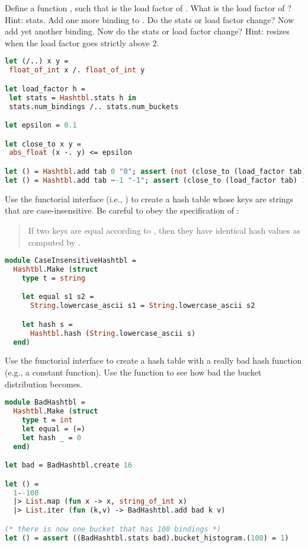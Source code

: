 Define a function , such that  is the load
factor of . What is the load factor of ? Hint: stats.
Add one more binding to . Do the stats or load factor change? Now add yet another binding. Now do the stats or
load factor change? Hint:  resizes when the load factor goes strictly above 2.

\begin{lstlisting}[language=OCaml]
let (/..) x y =
 float_of_int x /. float_of_int y

let load_factor h =
 let stats = Hashtbl.stats h in
 stats.num_bindings /.. stats.num_buckets

let epsilon = 0.1

let close_to x y =
 abs_float (x -. y) <= epsilon

let () = Hashtbl.add tab 0 "0"; assert (not (close_to (load_factor tab) 1.0))
let () = Hashtbl.add tab ~-1 "-1"; assert (close_to (load_factor tab) 1.0)
\end{lstlisting}

Use the functorial interface (i.e., ) to create a hash table whose keys are strings that are case-insensitive.
Be careful to obey the specification of :
\begin{quote}
  If two keys are equal according to , then they have identical hash values as computed by .
\end{quote}

\begin{lstlisting}[language=OCaml]
module CaseInsensitiveHashtbl =
  Hashtbl.Make (struct
    type t = string

    let equal s1 s2 =
      String.lowercase_ascii s1 = String.lowercase_ascii s2

    let hash s =
      Hashtbl.hash (String.lowercase_ascii s)
  end)   
\end{lstlisting}

Use the functorial interface to create a hash table with a really bad hash function (e.g., a constant function). Use the
 function to see how bad the bucket distribution becomes.

\begin{lstlisting}[language=OCaml]
module BadHashtbl =
  Hashtbl.Make (struct
    type t = int
    let equal = (=)
    let hash _ = 0
  end)

let bad = BadHashtbl.create 16

let () =
  1--100
  |> List.map (fun x -> x, string_of_int x)
  |> List.iter (fun (k,v) -> BadHashtbl.add bad k v)

(* there is now one bucket that has 100 bindings *)
let () = assert ((BadHashtbl.stats bad).bucket_histogram.(100) = 1)
\end{lstlisting}

